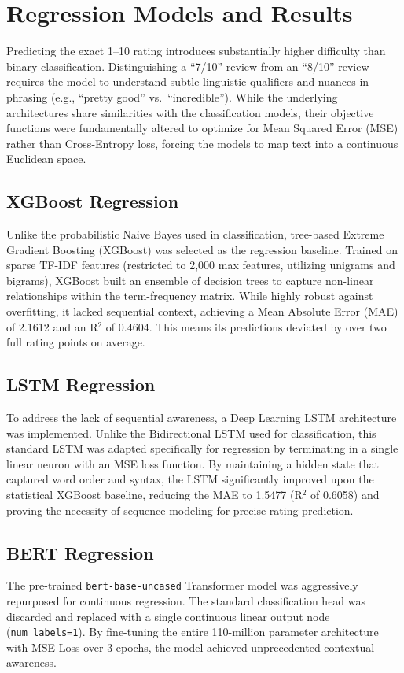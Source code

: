 \documentclass[conference]{IEEEtran}
\begin{document}
\section{Regression Models and Results}
Predicting the exact 1--10 rating introduces substantially higher difficulty than binary classification. Distinguishing a ``7/10'' review from an ``8/10'' review requires the model to understand subtle linguistic qualifiers and nuances in phrasing (e.g., ``pretty good'' vs.\ ``incredible''). While the underlying architectures share similarities with the classification models, their objective functions were fundamentally altered to optimize for Mean Squared Error (MSE) rather than Cross-Entropy loss, forcing the models to map text into a continuous Euclidean space.

\subsection{XGBoost Regression}
Unlike the probabilistic Naive Bayes used in classification, tree-based Extreme Gradient Boosting (XGBoost) was selected as the regression baseline. Trained on sparse TF-IDF features (restricted to 2,000 max features, utilizing unigrams and bigrams), XGBoost built an ensemble of decision trees to capture non-linear relationships within the term-frequency matrix. While highly robust against overfitting, it lacked sequential context, achieving a Mean Absolute Error (MAE) of 2.1612 and an R$^2$ of 0.4604. This means its predictions deviated by over two full rating points on average.

\subsection{LSTM Regression}
To address the lack of sequential awareness, a Deep Learning LSTM architecture was implemented. Unlike the Bidirectional LSTM used for classification, this standard LSTM was adapted specifically for regression by terminating in a single linear neuron with an MSE loss function. By maintaining a hidden state that captured word order and syntax, the LSTM significantly improved upon the statistical XGBoost baseline, reducing the MAE to 1.5477 (R$^2$ of 0.6058) and proving the necessity of sequence modeling for precise rating prediction.

\subsection{BERT Regression}
The pre-trained \texttt{bert-base-uncased} Transformer model was aggressively repurposed for continuous regression. The standard classification head was discarded and replaced with a single continuous linear output node (\texttt{num\_labels=1}). By fine-tuning the entire 110-million parameter architecture with MSE Loss over 3 epochs, the model achieved unprecedented contextual awareness. 
\end{document}
